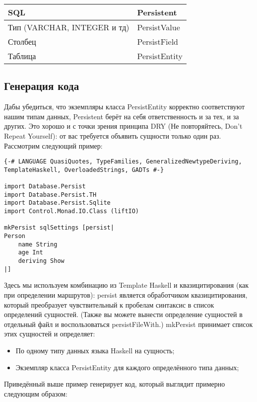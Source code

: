 \begin{center}
\begin{tabular}{ | l | l |}
\hline
SQL	& Persistent \\ \hline
Тип (VARCHAR, INTEGER и тд)	& PersistValue \\ \hline
Столбец & PersistField \\ \hline
Таблица	& PersistEntity \\ \hline
\end{tabular}
\end{center}

\subsection{Генерация кода}

Дабы убедиться, что экземпляры класса PersistEntity корректно соответствуют
нашим типам данных, Persistent берёт на себя ответственность и за тех, и за
других. Это хорошо и с точки зрения принципа DRY (Не повторяйтесь, Don't Repeat
Yourself): от вас требуется объявить сущности только один раз. Рассмотрим
следующий пример:

\begin{lstlisting}
{-# LANGUAGE QuasiQuotes, TypeFamilies, GeneralizedNewtypeDeriving, TemplateHaskell, OverloadedStrings, GADTs #-}

import Database.Persist
import Database.Persist.TH
import Database.Persist.Sqlite
import Control.Monad.IO.Class (liftIO)

mkPersist sqlSettings [persist|
Person
    name String
    age Int
    deriving Show
|]
\end{lstlisting}

Здесь мы используем комбинацию из Template Haskell и квазицитирования (как при
определении маршрутов): persist является обработчиком квазицитирования, который
преобразует чувствительный к пробелам синтаксис в список определений сущностей.
(Также вы можете вынести определение сущностей в отдельный файл и
воспользоваться persistFileWith.) mkPersist принимает список этих сущностей и
определяет:

\begin{itemize}
  \item По одному типу данных языка Haskell на сущность;

  \item Экземпляр класса PersistEntity для каждого определённого типа данных;
\end{itemize}

Приведённый выше пример генерирует код, который выглядит примерно следующим
образом:

